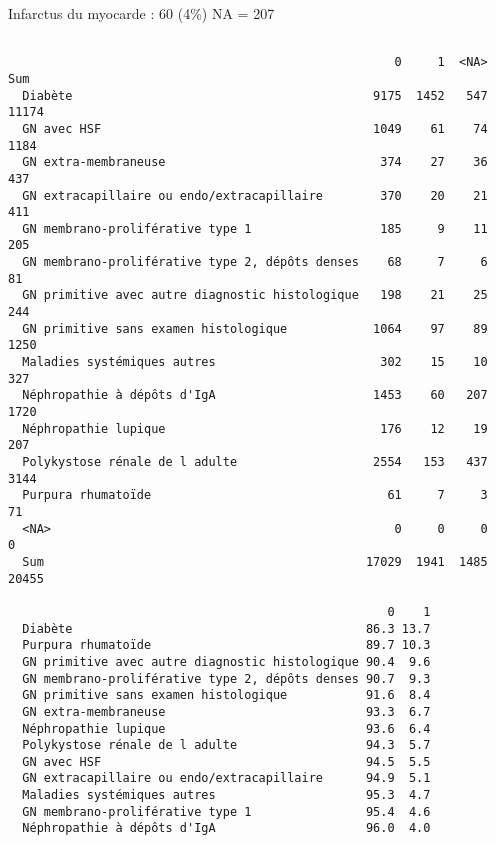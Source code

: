 \documentclass[11pt,a4paper]{article}\usepackage[]{graphicx}\usepackage[]{color}
\makeatletter
\newenvironment{kframe}{%
 \def\at@end@of@kframe{}%
 \ifinner\ifhmode%
  \def\at@end@of@kframe{\end{minipage}}%
  \begin{minipage}{\columnwidth}%
 \fi\fi%
 \def\FrameCommand##1{\hskip\@totalleftmargin \hskip-\fboxsep
 \colorbox{shadecolor}{##1}\hskip-\fboxsep
     \hskip-\linewidth \hskip-\@totalleftmargin \hskip\columnwidth}%
 \MakeFramed {\advance\hsize-\width
   \@totalleftmargin\z@ \linewidth\hsize
   \@setminipage}}%
 {\par\unskip\endMakeFramed%
 \at@end@of@kframe}
\newenvironment{knitrout}{}{} %
\makeatother
\begin{document}
Infarctus du myocarde : 60 (4\%) NA = 207

\begin{knitrout}
\color{fgcolor}\begin{kframe}
\begin{verbatim}
                                                 
                                                      0     1  <NA>   Sum
  Diabète                                          9175  1452   547 11174
  GN avec HSF                                      1049    61    74  1184
  GN extra-membraneuse                              374    27    36   437
  GN extracapillaire ou endo/extracapillaire        370    20    21   411
  GN membrano-proliférative type 1                  185     9    11   205
  GN membrano-proliférative type 2, dépôts denses    68     7     6    81
  GN primitive avec autre diagnostic histologique   198    21    25   244
  GN primitive sans examen histologique            1064    97    89  1250
  Maladies systémiques autres                       302    15    10   327
  Néphropathie à dépôts d'IgA                      1453    60   207  1720
  Néphropathie lupique                              176    12    19   207
  Polykystose rénale de l adulte                   2554   153   437  3144
  Purpura rhumatoïde                                 61     7     3    71
  <NA>                                                0     0     0     0
  Sum                                             17029  1941  1485 20455
                                                 
                                                     0    1
  Diabète                                         86.3 13.7
  Purpura rhumatoïde                              89.7 10.3
  GN primitive avec autre diagnostic histologique 90.4  9.6
  GN membrano-proliférative type 2, dépôts denses 90.7  9.3
  GN primitive sans examen histologique           91.6  8.4
  GN extra-membraneuse                            93.3  6.7
  Néphropathie lupique                            93.6  6.4
  Polykystose rénale de l adulte                  94.3  5.7
  GN avec HSF                                     94.5  5.5
  GN extracapillaire ou endo/extracapillaire      94.9  5.1
  Maladies systémiques autres                     95.3  4.7
  GN membrano-proliférative type 1                95.4  4.6
  Néphropathie à dépôts d'IgA                     96.0  4.0
\end{verbatim}
\end{kframe}
\end{knitrout}
\end{document}
